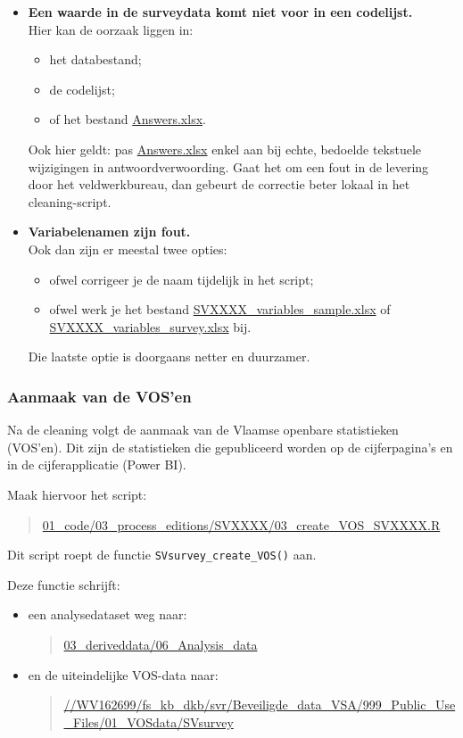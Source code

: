 \documentclass{VSAnote}
\begin{document}
\begin{enumerate}
\begin{itemize}
\item \textbf{Een waarde in de surveydata komt niet voor in een codelijst.}\\
Hier kan de oorzaak liggen in:
\begin{itemize}[nosep]
\item het databestand;
\item de codelijst;
\item of het bestand \url{Answers.xlsx}.
\end{itemize}
Ook hier geldt: pas \url{Answers.xlsx} enkel aan bij echte, bedoelde tekstuele wijzigingen in antwoordverwoording. Gaat het om een fout in de levering door het veldwerkbureau, dan gebeurt de correctie beter lokaal in het cleaning-script.

\item \textbf{Variabelenamen zijn fout.}\\
Ook dan zijn er meestal twee opties:
\begin{itemize}[nosep]
\item ofwel corrigeer je de naam tijdelijk in het script;
\item ofwel werk je het bestand \url{SVXXXX_variables_sample.xlsx} of \url{SVXXXX_variables_survey.xlsx} bij.
\end{itemize}
Die laatste optie is doorgaans netter en duurzamer.

\end{itemize}

\end{enumerate}

\subsubsection{Aanmaak van de VOS'en}
\label{sec:VOS}

Na de cleaning volgt de aanmaak van de Vlaamse openbare statistieken (VOS'en). Dit zijn de statistieken die gepubliceerd worden op de cijferpagina's en in de cijferapplicatie (Power BI).

Maak hiervoor het script:
\begin{quote}
\url{01_code/03_process_editions/SVXXXX/03_create_VOS_SVXXXX.R}
\end{quote}
Dit script roept de functie \verb+SVsurvey_create_VOS()+ aan.

Deze functie schrijft:
\begin{itemize}
\item een analysedataset weg naar:
\begin{quote}
\url{03_deriveddata/06_Analysis_data}
\end{quote}
\item en de uiteindelijke VOS-data naar:
\begin{quote}
\url{//WV162699/fs_kb_dkb/svr/Beveiligde_data_VSA/999_Public_Use_Files/01_VOSdata/SVsurvey}
\end{quote}
\end{itemize}
\end{document}
